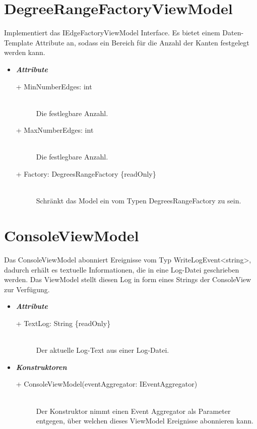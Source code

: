 \documentclass[13pt]{scrreprt}
\begin{document}
	\section{DegreeRangeFactoryViewModel}
	Implementiert das IEdgeFactoryViewModel Interface. Es bietet einem Daten-Template Attribute an, sodass ein Bereich f\"ur die Anzahl der Kanten festgelegt werden kann.
	\begin{itemize}[label = {$\circ$}]
		\item {\large \textbf{\textit{Attribute}}\par}
		\begin{description}
			\item [+ MinNumberEdges: int] \hfill \\ Die festlegbare Anzahl.
			\item [+ MaxNumberEdges: int] \hfill \\ Die festlegbare Anzahl.
			\item [+ Factory: DegreesRangeFactory \{readOnly\}] \hfill \\ Schr\"ankt das Model ein vom Typen DegreesRangeFactory zu sein.			
		\end{description}
	\end{itemize}

	
	\section{ConsoleViewModel}
	Das ConsoleViewModel abonniert Ereignisse vom Typ WriteLogEvent<string>, dadurch erh\"alt es textuelle Informationen, die in eine Log-Datei geschrieben werden. Das ViewModel stellt diesen Log in form eines Strings der ConsoleView zur Verf\"ugung.
	\begin{itemize}[label = {$\circ$}]
		\item {\large \textbf{\textit{Attribute}}\par}
		\begin{description}
			\item [+ TextLog: String \{readOnly\}] \hfill \\ Der aktuelle Log-Text aus einer Log-Datei.
		\end{description}
		\item {\large \textbf{\textit{Konstruktoren}}\par}
		\begin{description}
			\item [+  ConsoleViewModel(eventAggregator: IEventAggregator)] \hfill \\ Der Konstruktor nimmt einen Event Aggregator als Parameter entgegen, über welchen dieses ViewModel Ereignisse abonnieren kann.
		\end{description}
	\end{itemize}
	\newpage
\end{document}
